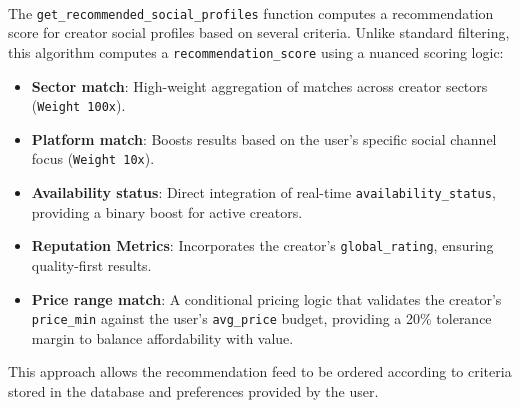 \paragraph{}The \texttt{get\_recommended\_social\_profiles} function computes a recommendation score for creator social profiles based on several criteria. Unlike standard filtering, this algorithm computes a \texttt{recommendation\_score} using a nuanced scoring logic:
\begin{itemize}
\item \textbf{Sector match}: High-weight aggregation of matches across creator sectors (\texttt{Weight 100x}).
\item \textbf{Platform match}: Boosts results based on the user's specific social channel focus (\texttt{Weight 10x}).
\item \textbf{Availability status}: Direct integration of real-time \texttt{availability\_status}, providing a binary boost for active creators.
\item \textbf{Reputation Metrics}: Incorporates the creator's \texttt{global\_rating}, ensuring quality-first results.
\item \textbf{Price range match}: A conditional pricing logic that validates the creator's \texttt{price\_min} against the user’s \texttt{avg\_price} budget, providing a 20\% tolerance margin to balance affordability with value.
\end{itemize}

This approach allows the recommendation feed to be ordered according to criteria stored in the database and preferences provided by the user.